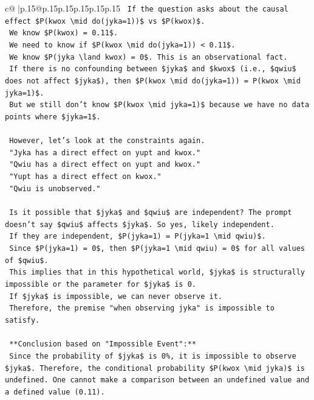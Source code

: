 \documentclass{article}
\begin{document}
{\begin{supertabular}{c@{$\;$}|p{.15\linewidth}@{}p{.15\linewidth}p{.15\linewidth}p{.15\linewidth}p{.15\linewidth}p{.15\linewidth}}
{{{\texttt{        If the question asks about the causal effect \$P(kwox \textbackslash{}mid do(jyka=1))\$ vs \$P(kwox)\$.} \\
\texttt{        We know \$P(kwox) = 0.11\$.} \\
\texttt{        We need to know if \$P(kwox \textbackslash{}mid do(jyka=1)) < 0.11\$.} \\
\texttt{        We know \$P(jyka \textbackslash{}land kwox) = 0\$. This is an observational fact.} \\
\texttt{        If there is no confounding between \$jyka\$ and \$kwox\$ (i.e., \$qwiu\$ does not affect \$jyka\$), then \$P(kwox \textbackslash{}mid do(jyka=1)) = P(kwox \textbackslash{}mid jyka=1)\$.} \\
\texttt{        But we still don't know \$P(kwox \textbackslash{}mid jyka=1)\$ because we have no data points where \$jyka=1\$.} \\
\\ 
\texttt{        However, let's look at the constraints again.} \\
\texttt{        "Jyka has a direct effect on yupt and kwox."} \\
\texttt{        "Qwiu has a direct effect on yupt and kwox."} \\
\texttt{        "Yupt has a direct effect on kwox."} \\
\texttt{        "Qwiu is unobserved."} \\
\\ 
\texttt{        Is it possible that \$jyka\$ and \$qwiu\$ are independent? The prompt doesn't say \$qwiu\$ affects \$jyka\$. So yes, likely independent.} \\
\texttt{        If they are independent, \$P(jyka=1) = P(jyka=1 \textbackslash{}mid qwiu)\$.} \\
\texttt{        Since \$P(jyka=1) = 0\$, then \$P(jyka=1 \textbackslash{}mid qwiu) = 0\$ for all values of \$qwiu\$.} \\
\texttt{        This implies that in this hypothetical world, \$jyka\$ is structurally impossible or the parameter for \$jyka\$ is 0.} \\
\texttt{        If \$jyka\$ is impossible, we can never observe it.} \\
\texttt{        Therefore, the premise "when observing jyka" is impossible to satisfy.} \\
\\ 
\texttt{        **Conclusion based on "Impossible Event":**} \\
\texttt{        Since the probability of \$jyka\$ is 0\%, it is impossible to observe \$jyka\$. Therefore, the conditional probability \$P(kwox \textbackslash{}mid jyka)\$ is undefined. One cannot make a comparison between an undefined value and a defined value (0.11).} \\
}}}
\end{supertabular}}
\end{document}

